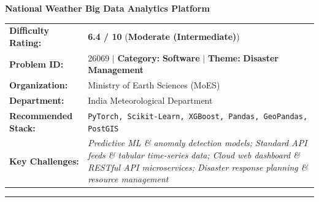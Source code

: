 \documentclass[10pt,a4paper]{article}
\begin{document}
\begin{tcolorbox}[pscard, title={"\textbf{SIH26069} \quad $\vert$ \quad National Weather Big Data Analytics Platform}]
\textbf{\large National Weather Big Data Analytics Platform}\\[0.25cm]

\begin{tabular}{@{}lp{12.5cm}@{}}
\textbf{Difficulty Rating:} & \textcolor{diffmod}{\textbf{\Large 6.4 / 10}} \quad (\textbf{Moderate (Intermediate)}) \\
\textbf{Problem ID:} & 26069 \quad $\vert$ \quad \textbf{Category:} \textbf{Software} \quad $\vert$ \quad \textbf{Theme:} \textbf{Disaster Management} \\
\textbf{Organization:} & Ministry of Earth Sciences (MoES) \\
\textbf{Department:} & India Meteorological Department \\
\textbf{Recommended Stack:} & \texttt{PyTorch, Scikit-Learn, XGBoost, Pandas, GeoPandas, PostGIS} \\
\textbf{Key Challenges:} & \textit{\small Predictive ML \& anomaly detection models; Standard API feeds \& tabular time-series data; Cloud web dashboard \& RESTful API microservices; Disaster response planning \& resource management} \\
\end{tabular}

\vspace{0.2cm}
\hrule
\vspace{0.2cm}


\end{tcolorbox}
\end{document}
